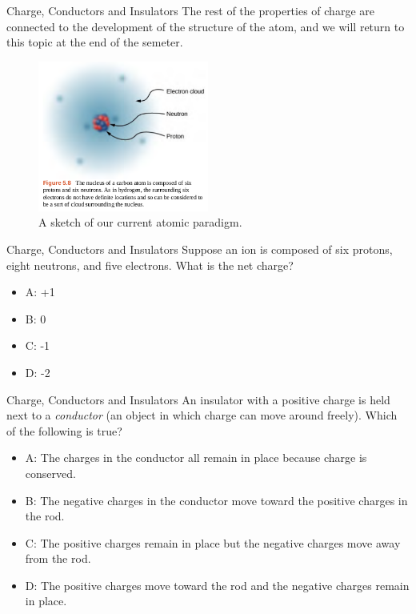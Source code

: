 \documentclass{beamer}
\begin{document}
\begin{frame}{Charge, Conductors and Insulators}
The rest of the properties of charge are connected to the development of the structure of the atom, and we will return to this topic at the end of the semeter.
\begin{figure}
\centering
\includegraphics[width=0.5\textwidth]{figures/atom.png}
\caption{\label{fig:atom} A sketch of our current atomic paradigm.}
\end{figure}
\end{frame}

\begin{frame}{Charge, Conductors and Insulators}
Suppose an ion is composed of six protons, eight neutrons, and five electrons.  What is the net charge?
\begin{itemize}
\item A: +1
\item B: 0
\item C: -1
\item D: -2
\end{itemize}
\end{frame}

\begin{frame}{Charge, Conductors and Insulators}
An insulator with a positive charge is held next to a \textit{conductor} (an object in which charge can move around freely).  Which of the following is true?
\begin{itemize}
\item A: The charges in the conductor all remain in place because charge is conserved.
\item B: The negative charges in the conductor move toward the positive charges in the rod.
\item C: The positive charges remain in place but the negative charges move away from the rod.
\item D: The positive charges move toward the rod and the negative charges remain in place.
\end{itemize}
\end{frame}
\end{document}
